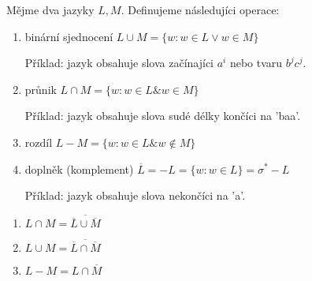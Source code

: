 \documentclass[../main.tex]{subfiles}
\begin{document}
\begin{definition}
    Mějme dva jazyky $L,M$. Definujeme následujíci operace:
    \begin{enumerate}
        \item binární sjednocení $L\cup M = \{w: w\in L \lor w \in M\}$
        \begin{remark}
            Příklad: jazyk obsahuje slova začínajíci $a^i$ nebo tvaru $b^j c^j$.
        \end{remark}
        \item průnik $L\cap M = \{w: w\in L \& w\in M\}$
        \begin{remark}
            Příklad: jazyk obsahuje slova sudé délky končíci na 'baa'.    
        \end{remark}
        \item rozdíl $L - M = \{w: w\in L \& w \notin M\}$
        \item doplněk (komplement) $\overline{L} = -L = \{w: w\in L\} = \sigma^* -L$
        \begin{remark}
            Příklad: jazyk obsahuje slova nekončíci na 'a'.
        \end{remark}
    \end{enumerate}
\end{definition}

\begin{theorem}
    \begin{enumerate}
        \item $L\cap M = \overline{\overline{L}\cup \overline{M}}$
        \item $L\cup M = \overline{\overline{L}\cap \overline{M}}$
        \item $L - M = L \cap \overline{M}$
    \end{enumerate}
\end{theorem}
\end{document}
